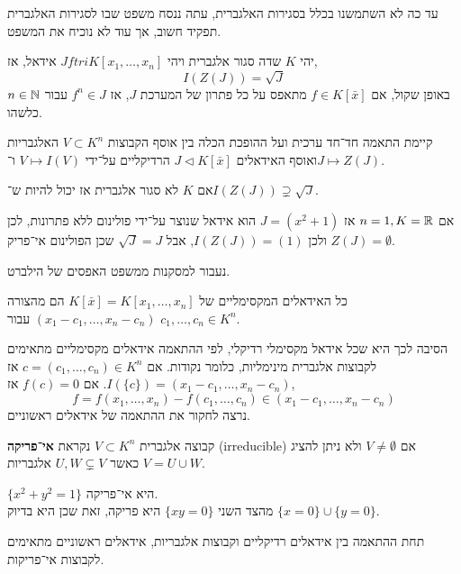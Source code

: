עד כה לא השתמשנו בכלל בסגירות האלגברית, עתה ננסח משפט שבו לסגירות האלגברית תפקיד חשוב, אך עוד לא נוכיח את המשפט.
\begin{theorem}
	יהי $K$ שדה סגור אלגברית ויהי $J ftri K[x_1, \ldots, x_n]$ אידאל, אז,
	\[
		I(Z(J))
		= \sqrt{J}
	\]
	באופן שקול, אם $f \in K[\bar{x}]$ מתאפס על כל פתרון של המערכת $J$, אז $f^n \in J$ עבור $n \in \mathbb{N}$ כלשהו.
\end{theorem}
\begin{corollary}
	קיימת התאמה חד־חד ערכית ועל ההופכת הכלה בין אוסף הקבוצות $V \subset K^n$ האלגבריות ואוסף האידאלים $J \triangleleft K[\bar{x}]$ הרדיקליים על־ידי $V \mapsto I(V)$ ו־$J \mapsto Z(J)$.
\end{corollary}
\begin{remark}
	אם $K$ לא סגור אלגברית אז יכול להיות ש־$I(Z(J)) \supsetneq \sqrt{J}$.
\end{remark}
\begin{example}
	אם $n = 1, K = \mathbb{R}$ אז $J = (x^2 + 1)$ הוא אידאל שנוצר על־ידי פולינום ללא פתרונות, לכן $Z(J) = \emptyset$ ולכן $I(Z(J)) = (1)$, אבל $\sqrt{J} = J$ שכן הפולינום אי־פריק.
\end{example}
נעבור למסקנות ממשפט האפסים של הילברט.
\begin{corollary}
	כל האידאלים המקסימליים של $K[\bar{x}] = K[x_1, \ldots, x_n]$ הם מהצורה $(x_1 - c_1, \ldots, x_n - c_n)$ עבור $c_1, \ldots, c_n \in K^n$.
\end{corollary}
הסיבה לכך היא שכל אידאל מקסימלי רדיקלי, לפי ההתאמה אידאלים מקסימליים מתאימים לקבוצות אלגברית מינימליות, כלומר נקודות.
אם $c = (c_1, \ldots, c_n) \in K^n$ אז $I(\{ c \}) = (x_1 - c_1, \ldots, x_n - c_n)$.
אם $f(c) = 0$ אז,
\[
	f = f(x_1, \ldots, x_n) - f(c_1, \ldots, c_n) \in (x_1 - c_1, \ldots, x_n - c_n)
\]
נרצה לחקור את ההתאמה של אידאלים ראשוניים.
\begin{definition}
	קבוצה אלגברית $V \subset K^n$ נקראת \textbf{אי־פריקה} (irreducible) אם $V \ne \emptyset$ ולא ניתן להציג $V = U \cup W$ כאשר $U, W \subsetneq V$ אלגבריות.
\end{definition}
\begin{example}
	$\{ x^2 + y^2 = 1 \}$ היא אי־פריקה. \\
	מהצד השני $\{ x y = 0 \}$ היא פריקה, זאת שכן היא בדיוק $\{ x = 0 \} \cup \{ y = 0 \}$.
\end{example}
\begin{proposition}
	תחת ההתאמה בין אידאלים רדיקליים וקבוצות אלגבריות, אידאלים ראשוניים מתאימים לקבוצות אי־פריקות.
\end{proposition}
